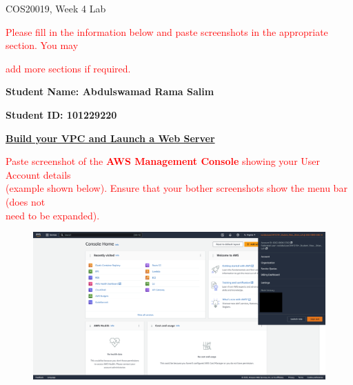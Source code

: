 \documentclass[11pt]{article}
\begin{document}
\noindent COS20019, Week 4 Lab 

\vspace{0.8cm}

\noindent\textcolor{red}{Please fill in the information below and paste screenshots in the appropriate section. You may}

\vspace{0.1cm}

\noindent\textcolor{red}{add more sections if required.}

\vspace{0.4cm}

\noindent\textbf{Student Name: Abdulswamad Rama Salim} 

\vspace{0.45cm}

\noindent\textbf{Student ID\@: 101229220}

\vspace{1.2cm}

\noindent\underline{\textbf{Build your VPC and Launch a Web Server}}

\vspace{0.6cm}

\noindent\textcolor{red}{Paste screenshot of the \textbf{AWS Management Console} showing your User Account details \\(example shown below). Ensure that your bother screenshots show the menu bar (does not \\need to be expanded).}

\vspace{0.6cm}

\begin{figure}[h]
    \centering
    \includegraphics[width=6.2in]{pics/pic.png}
\end{figure}
\end{document}
